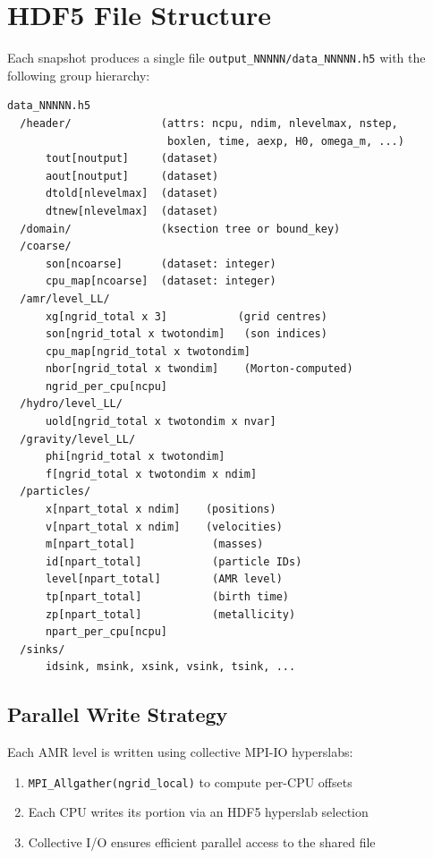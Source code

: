 \documentclass[11pt,fleqn]{book}
\begin{document}
\section{HDF5 File Structure}

Each snapshot produces a single file \texttt{output\_NNNNN/data\_NNNNN.h5} with the following group hierarchy:

\begin{lstlisting}[style=bash,numbers=none]
data_NNNNN.h5
  /header/              (attrs: ncpu, ndim, nlevelmax, nstep,
                         boxlen, time, aexp, H0, omega_m, ...)
      tout[noutput]     (dataset)
      aout[noutput]     (dataset)
      dtold[nlevelmax]  (dataset)
      dtnew[nlevelmax]  (dataset)
  /domain/              (ksection tree or bound_key)
  /coarse/
      son[ncoarse]      (dataset: integer)
      cpu_map[ncoarse]  (dataset: integer)
  /amr/level_LL/
      xg[ngrid_total x 3]           (grid centres)
      son[ngrid_total x twotondim]   (son indices)
      cpu_map[ngrid_total x twotondim]
      nbor[ngrid_total x twondim]    (Morton-computed)
      ngrid_per_cpu[ncpu]
  /hydro/level_LL/
      uold[ngrid_total x twotondim x nvar]
  /gravity/level_LL/
      phi[ngrid_total x twotondim]
      f[ngrid_total x twotondim x ndim]
  /particles/
      x[npart_total x ndim]    (positions)
      v[npart_total x ndim]    (velocities)
      m[npart_total]            (masses)
      id[npart_total]           (particle IDs)
      level[npart_total]        (AMR level)
      tp[npart_total]           (birth time)
      zp[npart_total]           (metallicity)
      npart_per_cpu[ncpu]
  /sinks/
      idsink, msink, xsink, vsink, tsink, ...
\end{lstlisting}

\subsection{Parallel Write Strategy}

Each AMR level is written using collective MPI-IO hyperslabs:

\begin{enumerate}
  \item \texttt{MPI\_Allgather(ngrid\_local)} to compute per-CPU offsets
  \item Each CPU writes its portion via an HDF5 hyperslab selection
  \item Collective I/O ensures efficient parallel access to the shared file
\end{enumerate}
\end{document}
